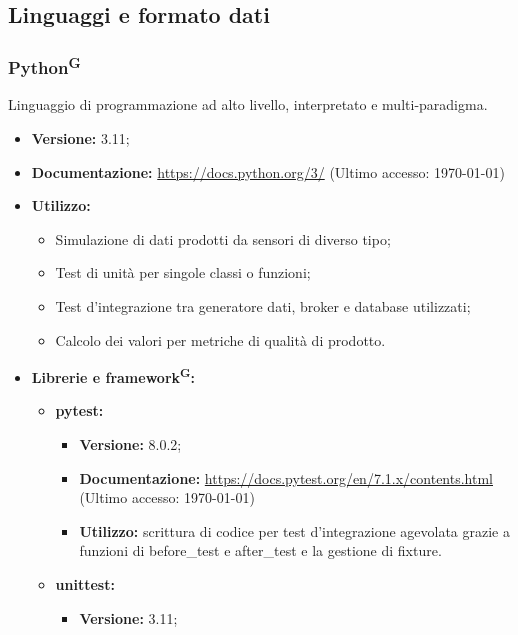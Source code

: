 \documentclass[8pt]{article}
\newcommand{\glossterm}[1]{#1\textsuperscript{G}} %
\begin{document}
\subsection{Linguaggi e formato dati}
\subsubsection{\glossterm{Python}}
Linguaggio di programmazione ad alto livello, interpretato e multi-paradigma.
\begin{itemize}
	\setlength\itemsep{0em}
    \item \textbf{Versione:} 3.11;
    \item \textbf{Documentazione:} \href{https://docs.python.org/3/}{\color{myblue}https://docs.python.org/3/} (Ultimo accesso: \today)
    \item \textbf{Utilizzo:} 
    \begin{itemize}
	\setlength\itemsep{0em}
        \item Simulazione di dati prodotti da sensori di diverso tipo;
        \item Test di unità per singole classi o funzioni;
        \item Test d'integrazione tra generatore dati, broker e database utilizzati;
        \item Calcolo dei valori per metriche di qualità di prodotto.
    \end{itemize}
    \clearpage
    \item \textbf{Librerie e \glossterm{framework}:}   
    \begin{itemize}
	\setlength\itemsep{0em}
        \item \textbf{pytest:}
        \begin{itemize}
	\setlength\itemsep{0em}
            \item \textbf{Versione:} 8.0.2;
            \item \textbf{Documentazione:} \href{https://docs.pytest.org/en/7.1.x/contents.html}{\color{myblue}https://docs.pytest.org/en/7.1.x/contents.html} (Ultimo accesso: \today)
            \item \textbf{Utilizzo:} scrittura di codice per test d'integrazione agevolata grazie a funzioni di before\_test e after\_test e la gestione di fixture.
        \end{itemize}
        \item \textbf{unittest:}
        \begin{itemize}
	\setlength\itemsep{0em}
            \item \textbf{Versione:} 3.11;

\end{itemize}
\end{itemize}
\end{itemize}
\end{document}
